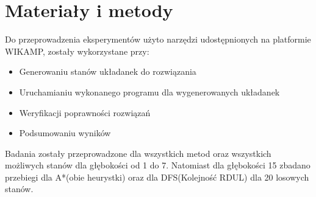 \documentclass{classrep}
\begin{document}
    \section{Materiały i metody}
    {
        Do przeprowadzenia eksperymentów użyto narzędzi udostępnionych na platformie WIKAMP,
        zostały wykorzystane przy:
        \begin{itemize}
            \item Generowaniu stanów układanek do rozwiązania
            \item Uruchamianiu wykonanego programu dla wygenerowanych układanek
            \item Weryfikacji poprawności rozwiązań
            \item Podsumowaniu wyników
        \end{itemize}
        Badania zostały przeprowadzone dla wszystkich metod oraz wszystkich możliwych stanów dla
        głębokości od 1 do 7. Natomiast dla głębokości 15 zbadano przebiegi dla A*(obie heurystki)
        oraz dla DFS(Kolejność RDUL) dla 20 losowych stanów.
    }\label{sec:materiay-i-metody}
\end{document}
